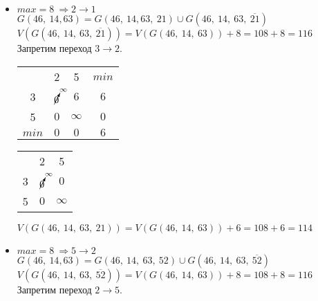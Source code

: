 \begin{itemize}
	\item $max = 8\ \Rightarrow 2 \rightarrow 1$\\
	
	$G(46,\ 14, 63) = G(46,\ 14, 63,\ 21) \cup G(46,\ 14,\ 63,\ \overline{21})$\\
	$V(G(46,\ 14,\ 63,\ \overline{21})) = V(G(46,\ 14,\ 63)) + 8 = 108 + 8 = 116$\\
	Запретим переход $3 \rightarrow 2$.

	\begin{table}[H]
	\begin{center}
		\def\tabcolsep{18pt}
		\def\arraystretch{1.5}
		\fontsize{13}{14}\selectfont
		\begin{tabular}{|c||c|c||c|}
			\hline 
	  		& 2 & 5 & $min$\\ 
			\hhline{|=#=|=#=|} 
			3 & $\cancelto{\infty}{0}$ & $6$ & $6$ \\ 
			\hline 
			5 & $0$ & $\infty$ & $0$ \\ 
			\hhline{|=#=|=#=|}
			$min$ & $0$ & $0$ & $6$ \\
			\hline
		\end{tabular}  
	\end{center}
	\end{table}

	\begin{table}[H]
	\begin{center}
		\def\tabcolsep{18pt}
		\def\arraystretch{1.5}
		\fontsize{13}{14}\selectfont
		\begin{tabular}{|c||c|c|}
			\hline 
	  		& 2 & 5\\ 
			\hhline{|=#=|=|} 
			3 & $\cancelto{\infty}{0}$ & $0$ \\ 
			\hline 
			5 & $0$ & $\infty$ \\ 
			\hline
		\end{tabular}  
	\end{center}
	\end{table}

	$V(G(46,\ 14,\ 63,\ 21)) = V(G(46,\ 14,\  63)) + 6 = 108 + 6 = 114$\\
	
	
	\item $max = 8\ \Rightarrow 5 \rightarrow 2$\\
	
	$G(46,\ 14, 63) = G(46,\ 14,\ 63,\ 52) \cup G(46,\ 14,\ 63,\ \overline{52})$\\
	$V(G(46,\ 14,\ 63,\ \overline{52})) = V(G(46,\ 14,\ 63)) + 8 = 108 + 8 = 116$\\
	Запретим переход $2 \rightarrow 5$.


\end{itemize}
